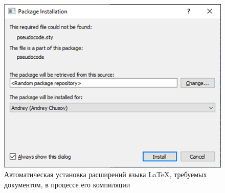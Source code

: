 \documentclass[report, draught]{fefudoc}
\begin{document}
\begin{figure}
\centering
\includegraphics{workbook-extras/miktex-package-installation}
\caption{Автоматическая установка расширений языка \LaTeX, требуемых документом, в процессе его компиляции}
\label{автоустановка расширений miktex}
\end{figure}
\end{document}
